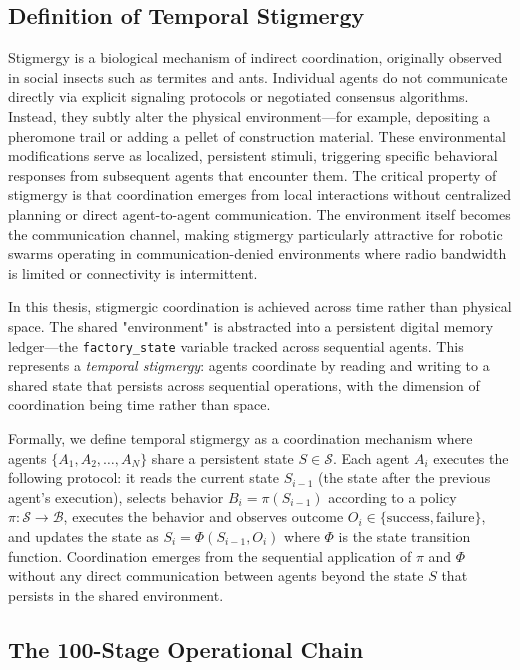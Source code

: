 \documentclass[12pt,a4paper,oneside]{report}
\begin{document}
\subsection{Definition of Temporal Stigmergy}
\label{subsec:definition_of_temporal_stigmergy}

Stigmergy is a biological mechanism of indirect coordination, originally observed in social insects such as termites and ants. Individual agents do not communicate directly via explicit signaling protocols or negotiated consensus algorithms. Instead, they subtly alter the physical environment—for example, depositing a pheromone trail or adding a pellet of construction material. These environmental modifications serve as localized, persistent stimuli, triggering specific behavioral responses from subsequent agents that encounter them. The critical property of stigmergy is that coordination emerges from local interactions without centralized planning or direct agent-to-agent communication. The environment itself becomes the communication channel, making stigmergy particularly attractive for robotic swarms operating in communication-denied environments where radio bandwidth is limited or connectivity is intermittent.

In this thesis, stigmergic coordination is achieved across time rather than physical space. The shared "environment" is abstracted into a persistent digital memory ledger—the \texttt{factory\_state} variable tracked across sequential agents. This represents a \textit{temporal stigmergy}: agents coordinate by reading and writing to a shared state that persists across sequential operations, with the dimension of coordination being time rather than space.

Formally, we define temporal stigmergy as a coordination mechanism where agents $\{A_1, A_2, \ldots, A_N\}$ share a persistent state $S \in \mathcal{S}$. Each agent $A_i$ executes the following protocol: it reads the current state $S_{i-1}$ (the state after the previous agent's execution), selects behavior $B_i = \pi(S_{i-1})$ according to a policy $\pi: \mathcal{S} \rightarrow \mathcal{B}$, executes the behavior and observes outcome $O_i \in \{\text{success}, \text{failure}\}$, and updates the state as $S_i = \Phi(S_{i-1}, O_i)$ where $\Phi$ is the state transition function. Coordination emerges from the sequential application of $\pi$ and $\Phi$ without any direct communication between agents beyond the state $S$ that persists in the shared environment.

\subsection{The 100-Stage Operational Chain}
\label{subsec:the_100_stage_operational_chain}
\end{document}
